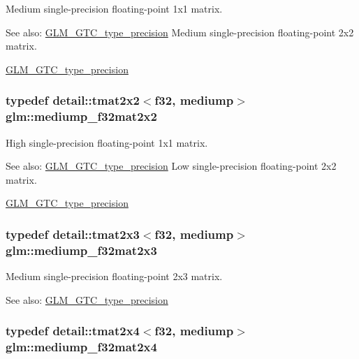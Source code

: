 Medium single-precision floating-point 1x1 matrix. \begin{Desc}
\item[See also:]\hyperlink{group__gtc__type__precision}{GLM\_\-GTC\_\-type\_\-precision} Medium single-precision floating-point 2x2 matrix. 

\hyperlink{group__gtc__type__precision}{GLM\_\-GTC\_\-type\_\-precision} \end{Desc}
\hypertarget{group__gtc__type__precision_g23c9239d6aa9b41c3d2145e2faa81edb}{
\subsubsection[mediump\_\-f32mat2x2]{\setlength{\rightskip}{0pt plus 5cm}typedef detail::tmat2x2$<$f32, mediump$>$ {\bf glm::mediump\_\-f32mat2x2}}}
\label{group__gtc__type__precision_g23c9239d6aa9b41c3d2145e2faa81edb}


High single-precision floating-point 1x1 matrix. \begin{Desc}
\item[See also:]\hyperlink{group__gtc__type__precision}{GLM\_\-GTC\_\-type\_\-precision} Low single-precision floating-point 2x2 matrix. 

\hyperlink{group__gtc__type__precision}{GLM\_\-GTC\_\-type\_\-precision} \end{Desc}
\hypertarget{group__gtc__type__precision_g42497d19668931d225bccf1b9c614c19}{
\subsubsection[mediump\_\-f32mat2x3]{\setlength{\rightskip}{0pt plus 5cm}typedef detail::tmat2x3$<$f32, mediump$>$ {\bf glm::mediump\_\-f32mat2x3}}}
\label{group__gtc__type__precision_g42497d19668931d225bccf1b9c614c19}


Medium single-precision floating-point 2x3 matrix. \begin{Desc}
\item[See also:]\hyperlink{group__gtc__type__precision}{GLM\_\-GTC\_\-type\_\-precision} \end{Desc}
\hypertarget{group__gtc__type__precision_g20c5b3b715b70f1c09f7f95bfaa7aa84}{
\subsubsection[mediump\_\-f32mat2x4]{\setlength{\rightskip}{0pt plus 5cm}typedef detail::tmat2x4$<$f32, mediump$>$ {\bf glm::mediump\_\-f32mat2x4}}}
\label{group__gtc__type__precision_g20c5b3b715b70f1c09f7f95bfaa7aa84}



